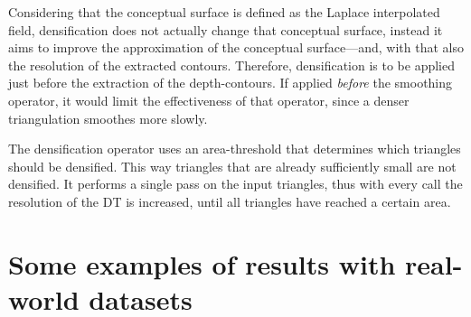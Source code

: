 %

Considering that the conceptual surface is defined as the Laplace interpolated field, densification does not actually change that conceptual surface, instead it aims to improve the approximation of the conceptual surface---and, with that also the resolution of the extracted contours.
Therefore, densification is to be applied just before the extraction of the depth-contours.
If applied \emph{before} the smoothing operator, it would limit the effectiveness of that operator, since a denser triangulation smoothes more slowly.

The densification operator uses an area-threshold that determines which triangles should be  densified. 
This way triangles that are already sufficiently small are not densified. 
It performs a single pass on the input triangles, thus with every call the resolution of the DT is increased, until all triangles have reached a certain area.



%
\section{Some examples of results with real-world datasets}


